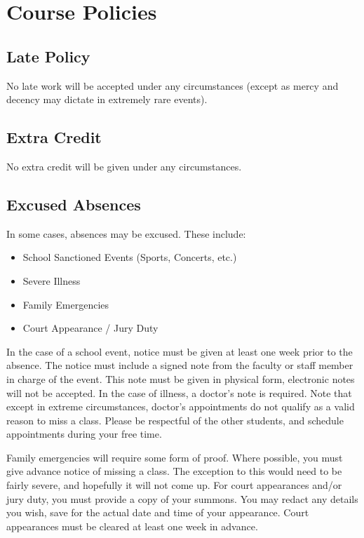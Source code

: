 \documentclass[11pt]{article}
\begin{document}



\newpage
\section*{Course Policies}

\subsection*{Late Policy}
No late work will be accepted under any circumstances (except as mercy
and decency may dictate in extremely rare events).

\subsection*{Extra Credit}
No extra credit will be given under any circumstances.

\subsection*{Excused Absences}
In some cases, absences may be excused. These include:
\begin{itemize}
    \item School Sanctioned Events (Sports, Concerts, etc.)
    \item Severe Illness
    \item Family Emergencies
    \item Court Appearance / Jury Duty
\end{itemize}
In the case of a school event, notice must be given at least one week
prior to the absence. The notice must include a signed note from the
faculty or staff member in charge of the event. This note must be
given in physical form, electronic notes will not be accepted.
In the case of illness, a doctor's note is required. Note that
except in extreme circumstances, doctor's appointments do not qualify as a valid reason to miss
a class. Please be respectful of the other students, and schedule
appointments during your free time.

Family emergencies will require some form of proof. Where possible,
you must give advance notice of missing a class. The exception to this
would need to be fairly severe, and hopefully it will not come up.
For court appearances and/or jury duty, you must provide a copy of
your summons. You may redact any details you wish, save for the
actual date and time of your appearance. Court appearances must be
cleared at least one week in advance.
\end{document}
